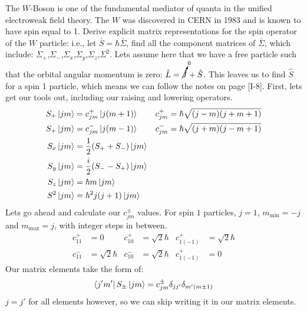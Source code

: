 \documentclass{jhwhw}
\begin{document}
The $W$-Boson is one of the fundamental mediator of quanta in the unified electroweak field theory.  The $W$ was discovered in CERN in 1983 and is known to have spin equal to 1.  Derive explicit matrix representations for the spin operator of the $W$ particle: i.e., let $\bar{S}= \hbar \bar{\Sigma}$, find all the component matrices of $\bar{\Sigma}$, which include: $\Sigma_+$,$\Sigma_-$,$\Sigma_x$,$\Sigma_y$,$\Sigma_z$,$\Sigma^2.$
\solution
Lets assume here that we have a free particle such that the orbital angular momentum is zero: $\hat{L} = \cancelto{0}{\hat{J}} + \hat{S}$. This leaves us to find $\hat{S}$ for a spin 1 particle, which means we can follow the notes on page [I-8].  First, lets get our tools out, including our raising and lowering operators.
\begin{align}
    S_+\ket{jm}
    &=
    c_{jm}^+\ket{j(m+1)}
    &
    c_{jm}^+
    &=
    \hbar\sqrt{(j-m)(j+m+1)}
    \\
    S_+\ket{jm}
    &=
    c_{jm}^-\ket{j(m-1)}
    &
    c_{jm}^-
    &=
    \hbar\sqrt{(j+m)(j-m+1)}
    \\
    \label{eq:sx}
    S_x\ket{jm}
    &=
    \frac{1}{2}(S_+ + S_-)\ket{jm}
    \\
    \label{eq:sy}
    S_y\ket{jm}
    &=
    \frac{i}{2}(S_- - S_+)\ket{jm}
    \\
    \label{eq:sz}
    S_z\ket{jm}
    &=
    \hbar m\ket{jm}
    \\
    \label{eq:s2}
    S^2\ket{jm}
    &=
    \hbar^2 j (j+1)\ket{jm}
\end{align}
Lets go ahead and calculate our $c_{jm}^\pm$ values.  For spin $1$ particles, $j=1$, $m_\text{min}=-j$ and $m_\text{max}=j$, with integer steps in between.
\begin{align}
    c_{11}^+ &= 0   &    c_{10}^+ &= \sqrt{2}\hbar  &   c_{1(-1)}^+ &= \sqrt{2}\hbar
    \\
    c_{11}^- &= \sqrt{2}\hbar   &    c_{10}^- &= \sqrt{2}\hbar  &   c_{1(-1)}^+ &= 0
\end{align}
Our matrix elements take the form of:
\begin{equation}
    \bra{j'm'}S_\pm\ket{jm} = c_{jm}^\pm \delta_{jj'}\delta_{m'(m\pm1)}
\end{equation}
$j = j'$ for all elements however, so we can skip writing it in our matrix elements.
\end{document}
